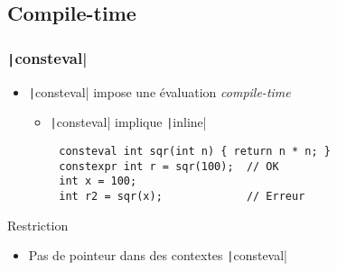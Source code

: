 \documentclass[C++.tex]{subfiles}
\begin{document}
\subsection*{Compile-time}
\begin{frame}[fragile]
	\frametitle{\texttt|consteval|}
	\begin{itemize}
		\item \texttt|consteval| impose une évaluation \textit{compile-time}


		\begin{itemize}
			\item \texttt|consteval| implique \texttt|inline|
		\end{itemize}
	\end{itemize}

	\begin{verbatim}
		consteval int sqr(int n) { return n * n; }
		constexpr int r = sqr(100);  // OK
		int x = 100;
		int r2 = sqr(x);             // Erreur
	\end{verbatim}

	\begin{alertblock}{Restriction}
		\begin{itemize}
			\item Pas de pointeur dans des contextes \texttt|consteval|
		\end{itemize}
	\end{alertblock}


\end{frame}
\end{document}
